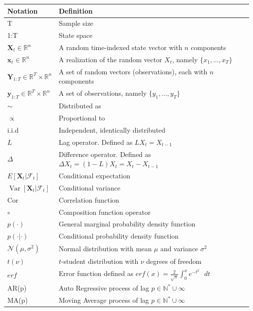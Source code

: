 \documentclass[11pt,a4,twosided,singlespacing,titlepagenumber=on]{scrreprt}
\numberwithin{equation}{chapter} %
\theoremstyle{remark}
\DeclareMathOperator{\var}{Var}
\newcommand{\matr}[1]{\mathbf{#1}}
\begin{document}
\begin{table}[h]
\centering
\begin{tabular}{ll}
\hline
\multicolumn{1}{|l|}{Notation}     & \multicolumn{1}{l|}{Definition} \\ \hline
T									& Sample size \\
1:T									& State space \\
$\matr{X}_t	\in \mathbb{R}^n$				& A random time-indexed state vector with $n$ components \\
$\matr{x}_t	\in \mathbb{R}^n$				& A realization of the random vector $X_t$, namely $\{x_1,...,x_T \}$ \\
$\matr{Y}_{1:T} \in \mathbb{R}^T \times \mathbb{R}^n$  		& A set of random vectors (observations), each with $n$ components \\
$\matr{y}_{1:T} \in \mathbb{R}^T \times \mathbb{R}^n $  		& A set of observations, namely $\{y_1,...,y_T \}$ \\
$\sim$								& Distributed as \\
$\propto$							& Proportional to \\
i.i.d								& Independent, identically distributed \\
$L$									& Lag operator. Defined as $L X_t = X_{t-1}$ \\
$\Delta$							& Difference operator. Defined as $\Delta X_t = (1-L) X_t = X_t - X_{t-1}$ \\
$E[\matr{X}_t | \mathcal{F}_t]$			& Conditional expectation \\
$\var[\matr{X}_t | \mathcal{F}_t]$			& Conditional variance \\
Cor									& Correlation function \\
$\circ$								& Composition function operator \\
$p(\cdot)$							& General marginal probability density function \\
$p(\cdot| \cdot)$					& Conditional probability density function \\
$\mathcal{N}(\mu, \sigma^2)$		& Normal distribution with mean $\mu$ and variance $\sigma^2$ \\
$t(\nu)$							& $t$-student distribution with $\nu$ degrees of freedom \\
$erf$								& Error function defined as $erf(x) = \frac{2}{\sqrt{\pi}} \int_0^x e^{-t^2}\text{ }dt$ \\
AR(p)									& Auto Regressive process of lag $p \in \mathbb{N}^* \cup \infty$ \\
MA(p)  								& Moving Average process of lag $p \in \mathbb{N}^* \cup \infty$ \\
\hline
\end{tabular}
\end{table}
\end{document}
